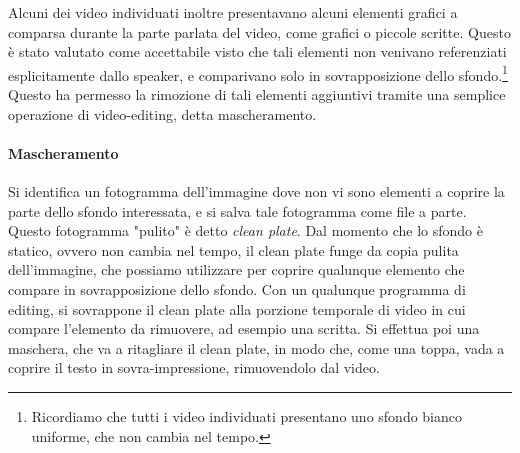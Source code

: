 Alcuni dei video individuati inoltre presentavano alcuni elementi grafici a comparsa durante la parte parlata del video, come grafici o piccole scritte. Questo è stato valutato come accettabile visto che tali elementi non venivano referenziati esplicitamente dallo speaker, e comparivano solo in sovrapposizione dello sfondo.\footnote{Ricordiamo che tutti i video individuati presentano uno sfondo bianco uniforme, che non cambia nel tempo.} Questo ha permesso la rimozione di tali elementi aggiuntivi tramite una semplice operazione di video-editing, detta mascheramento.

\paragraph{Mascheramento}

Si identifica un fotogramma dell'immagine dove non vi sono elementi a coprire la parte dello sfondo interessata, e si salva tale fotogramma come file a parte. Questo fotogramma "pulito" è detto \textit{clean plate}. Dal momento che lo sfondo è statico, ovvero non cambia nel tempo, il clean plate funge da copia pulita dell'immagine, che possiamo utilizzare per coprire qualunque elemento che compare in sovrapposizione dello sfondo. Con un qualunque programma di editing, si sovrappone il clean plate alla porzione temporale di video in cui compare l'elemento da rimuovere, ad esempio una scritta. Si effettua poi una maschera, che va a ritagliare il clean plate, in modo che, come una toppa, vada a coprire il testo in sovra-impressione, rimuovendolo dal video.

